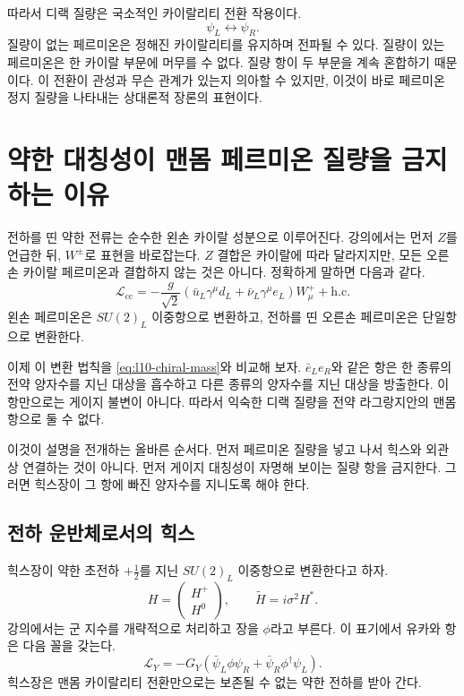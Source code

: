 따라서 디랙 질량은 국소적인 카이랄리티 전환 작용이다.
\begin{equation}
  \psi_L\longleftrightarrow\psi_R .
\end{equation}
질량이 없는 페르미온은 정해진 카이랄리티를 유지하며 전파될 수 있다. 질량이 있는 페르미온은 한 카이랄 부문에 머무를 수 없다. 질량 항이 두 부문을 계속 혼합하기 때문이다. 이 전환이 관성과 무슨 관계가 있는지 의아할 수 있지만, 이것이 바로 페르미온 정지 질량을 나타내는 상대론적 장론의 표현이다.

\section{약한 대칭성이 맨몸 페르미온 질량을 금지하는 이유}

전하를 띤 약한 전류는 순수한 왼손 카이랄 성분으로 이루어진다. 강의에서는 먼저 \(Z\)를 언급한 뒤, \(W^\pm\)로 표현을 바로잡는다. \(Z\) 결합은 카이랄에 따라 달라지지만, 모든 오른손 카이랄 페르미온과 결합하지 않는 것은 아니다. 정확하게 말하면 다음과 같다.
\begin{equation}
  \mathcal L_{\mathrm{cc}}
  =
  -\frac{g}{\sqrt2}
  \left(\bar u_L\gamma^\mu d_L
  +\bar\nu_L\gamma^\mu e_L\right)W^+_\mu
  +\mathrm{h.c.}
  \label{eq:l10-charged-current}
\end{equation}
왼손 페르미온은 \(SU(2)_L\) 이중항으로 변환하고, 전하를 띤 오른손 페르미온은 단일항으로 변환한다.

이제 이 변환 법칙을 \eqref{eq:l10-chiral-mass}와 비교해 보자. \(\bar e_L e_R\)와 같은 항은 한 종류의 전약 양자수를 지닌 대상을 흡수하고 다른 종류의 양자수를 지닌 대상을 방출한다. 이 항만으로는 게이지 불변이 아니다. 따라서 익숙한 디랙 질량을 전약 라그랑지안의 맨몸 항으로 둘 수 없다.

이것이 설명을 전개하는 올바른 순서다. 먼저 페르미온 질량을 넣고 나서 힉스와 외관상 연결하는 것이 아니다. 먼저 게이지 대칭성이 자명해 보이는 질량 항을 금지한다. 그러면 힉스장이 그 항에 빠진 양자수를 지니도록 해야 한다.

\subsection{전하 운반체로서의 힉스}

힉스장이 약한 초전하 \(+\tfrac12\)를 지닌 \(SU(2)_L\) 이중항으로 변환한다고 하자.
\begin{equation}
  H=
  \begin{pmatrix}
    H^+\\ H^0
  \end{pmatrix},
  \qquad
  \widetilde H=i\sigma^2H^* .
  \label{eq:l10-higgs-doublet}
\end{equation}
강의에서는 군 지수를 개략적으로 처리하고 장을 \(\phi\)라고 부른다. 이 표기에서 유카와 항은 다음 꼴을 갖는다.
\begin{equation}
  \mathcal L_Y
  =
  -G_Y\left(
    \bar\psi_L\phi\psi_R+
    \bar\psi_R\phi^\dagger\psi_L
  \right).
  \label{eq:l10-yukawa-schematic}
\end{equation}
힉스장은 맨몸 카이랄리티 전환만으로는 보존될 수 없는 약한 전하를 받아 간다.

